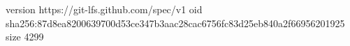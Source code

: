 version https://git-lfs.github.com/spec/v1
oid sha256:87d8ea8200639700d53ce347b3aac28cac6756fc83d25eb840a2f66956201925
size 4299
